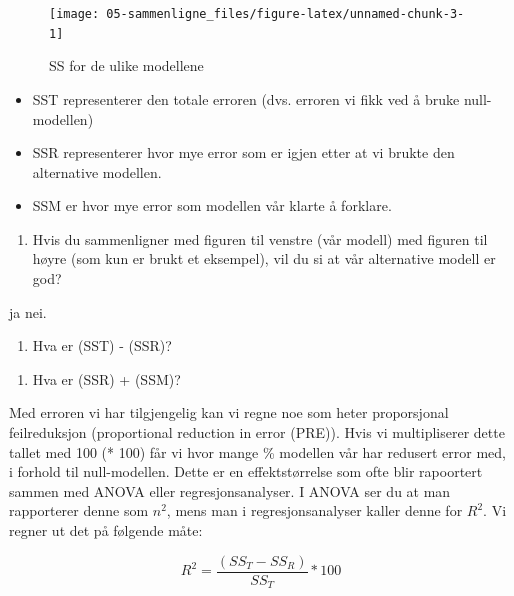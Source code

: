 \documentclass[
]{book}
\providecommand{\tightlist}{%
  \setlength{\itemsep}{0pt}\setlength{\parskip}{0pt}}
\begin{document}
\begin{figure}

{\centering \texttt{[image: 05-sammenligne\_files/figure-latex/unnamed-chunk-3-1]} 

}

\caption{SS for de ulike modellene}\label{fig:unnamed-chunk-3}
\end{figure}

\begin{itemize}
\tightlist
\item
  SST representerer den totale erroren (dvs. erroren vi fikk ved å bruke null-modellen)
\item
  SSR representerer hvor mye error som er igjen etter at vi brukte den alternative modellen.
\item
  SSM er hvor mye error som modellen vår klarte å forklare.
\end{itemize}

\begin{enumerate}
\def\labelenumi{\alph{enumi}.}
\setcounter{enumi}{3}
\tightlist
\item
  Hvis du sammenligner med figuren til venstre (vår modell) med figuren til høyre (som kun er brukt et eksempel), vil du si at vår alternative modell er god?
\end{enumerate}

ja nei.

\begin{enumerate}
\def\labelenumi{\alph{enumi}.}
\setcounter{enumi}{4}
\tightlist
\item
  Hva er (SST) - (SSR)?
\end{enumerate}

\begin{enumerate}
\def\labelenumi{\alph{enumi}.}
\setcounter{enumi}{5}
\tightlist
\item
  Hva er (SSR) + (SSM)?
\end{enumerate}

Med erroren vi har tilgjengelig kan vi regne noe som heter proporsjonal feilreduksjon (proportional reduction in error (PRE)). Hvis vi multipliserer dette tallet med 100 (* 100) får vi hvor mange \% modellen vår har redusert error med, i forhold til null-modellen. Dette er en effektstørrelse som ofte blir rapoortert sammen med ANOVA eller regresjonsanalyser. I ANOVA ser du at man rapporterer denne som \(n^2\), mens man i regresjonsanalyser kaller denne for \(R^2\). Vi regner ut det på følgende måte:

\[
R^2 = \frac{(SS_T - SS_R)}{SS_T} * 100
\]
\end{document}
